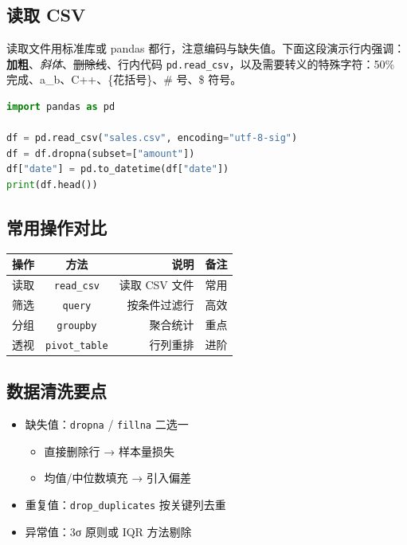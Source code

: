 \documentclass[zihao=-4]{ctexart}
\numberwithin{equation}{section}
\numberwithin{figure}{section}
\numberwithin{table}{section}
\theoremstyle{plain}
\begin{document}
\subsection{读取 CSV}

读取文件用标准库或 pandas 都行，注意编码与缺失值。下面这段演示行内强调：\textbf{加粗}、\emph{斜体}、\sout{删除线}、行内代码 \texttt{pd.read\_csv}，以及需要转义的特殊字符：50\% 完成、a\_b、C++、\{花括号\}、\# 号、\$ 符号。

\noindent \begin{lstlisting}[language=Python]
import pandas as pd

df = pd.read_csv("sales.csv", encoding="utf-8-sig")
df = df.dropna(subset=["amount"])
df["date"] = pd.to_datetime(df["date"])
print(df.head())
\end{lstlisting}

\subsection{常用操作对比}

\noindent \begin{tabular}{lcrc}
\toprule
操作 & 方法 & 说明 & 备注 \\
\midrule
读取 & \texttt{read\_csv} & 读取 CSV 文件 & 常用 \\
筛选 & \texttt{query} & 按条件过滤行 & 高效 \\
分组 & \texttt{groupby} & 聚合统计 & 重点 \\
透视 & \texttt{pivot\_table} & 行列重排 & 进阶 \\
\bottomrule
\end{tabular}

\subsection{数据清洗要点}

\begin{itemize}
\item 缺失值：\texttt{dropna} / \texttt{fillna} 二选一
\begin{itemize}
\item 直接删除行 → 样本量损失
\item 均值/中位数填充 → 引入偏差
\end{itemize}
\item 重复值：\texttt{drop\_duplicates} 按关键列去重
\item 异常值：3σ 原则或 IQR 方法剔除
\end{itemize}
\end{document}
